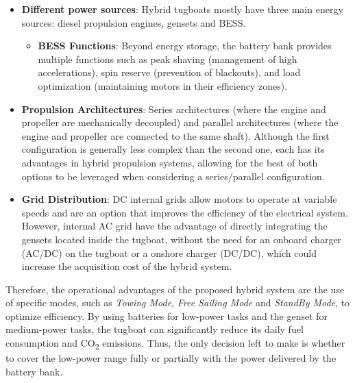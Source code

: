 \begin{itemize}
	\item \textbf{Different power sources}: Hybrid tugboats mostly have three main energy sources: diesel propulsion engines, gensets and BESS.
	\begin{itemize}
		\item \textbf{BESS Functions}: Beyond energy storage, the battery bank provides multiple functions such as peak shaving (management of high accelerations), spin reserve (prevention of blackouts), and load optimization (maintaining motors in their efficiency zones).
	\end{itemize}
	\item \textbf{Propulsion Architectures}: Series architectures (where the engine and propeller are mechanically decoupled) and parallel architectures (where the engine and propeller are connected to the same shaft). Although the first configuration is generally less complex than the second one, each has its advantages in hybrid propulsion systems, allowing for the best of both options to be leveraged when considering a series/parallel configuration.
	\item \textbf{Grid Distribution}: DC internal grids allow motors to operate at variable speeds and are an option that improves the efficiency of the electrical system. However, internal AC grid have the advantage of directly integrating the gensets located inside the tugboat, without the need for an onboard charger (AC/DC) on the tugboat or a onshore charger (DC/DC), which could increase the acquisition cost of the hybrid system.
\end{itemize}

Therefore, the operational advantages of the proposed hybrid system are the use of specific modes, such as \textit{Towing Mode}, \textit{Free Sailing Mode} and \textit{StandBy Mode}, to optimize efficiency. By using batteries for low-power tasks and the genset for medium-power tasks, the tugboat can significantly reduce its daily fuel consumption and CO\textsubscript{2} emissions. Thus, the only decision left to make is whether to cover the low-power range fully or partially with the power delivered by the battery bank.